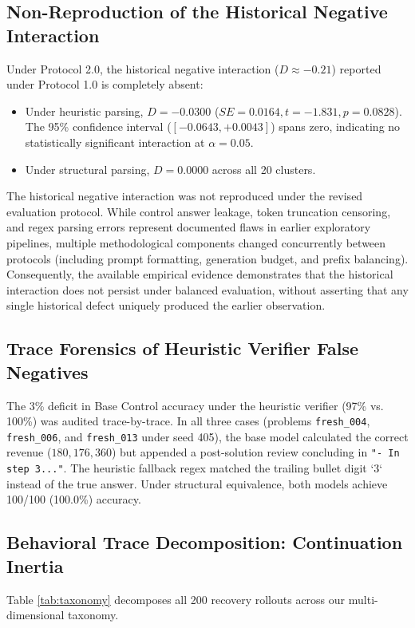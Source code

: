 \documentclass[11pt,letterpaper]{article}
\begin{document}
\subsection{Non-Reproduction of the Historical Negative Interaction}
Under Protocol 2.0, the historical negative interaction ($D \approx -0.21$) reported under Protocol 1.0 is completely absent:
\begin{itemize}
    \item Under heuristic parsing, $D = -0.0300$ ($SE = 0.0164, t = -1.831, p = 0.0828$). The 95\% confidence interval ($[-0.0643, +0.0043]$) spans zero, indicating no statistically significant interaction at $\alpha = 0.05$.
    \item Under structural parsing, $D = 0.0000$ across all 20 clusters.
\end{itemize}
The historical negative interaction was not reproduced under the revised evaluation protocol. While control answer leakage, token truncation censoring, and regex parsing errors represent documented flaws in earlier exploratory pipelines, multiple methodological components changed concurrently between protocols (including prompt formatting, generation budget, and prefix balancing). Consequently, the available empirical evidence demonstrates that the historical interaction does not persist under balanced evaluation, without asserting that any single historical defect uniquely produced the earlier observation.

\subsection{Trace Forensics of Heuristic Verifier False Negatives}
The 3\% deficit in Base Control accuracy under the heuristic verifier (97\% vs. 100\%) was audited trace-by-trace. In all three cases (problems \texttt{fresh\_004}, \texttt{fresh\_006}, and \texttt{fresh\_013} under seed 405), the base model calculated the correct revenue ($180, 176, 360$) but appended a post-solution review concluding in \texttt{"- In step 3..."}. The heuristic fallback regex matched the trailing bullet digit `3` instead of the true answer. Under structural equivalence, both models achieve 100/100 (100.0\%) accuracy.

\subsection{Behavioral Trace Decomposition: Continuation Inertia}
Table \ref{tab:taxonomy} decomposes all 200 recovery rollouts across our multi-dimensional taxonomy.
\end{document}
